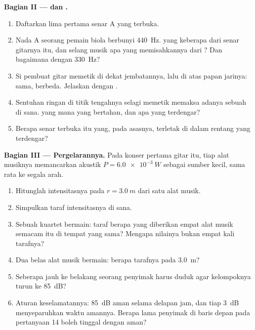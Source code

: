 \begin{problem}
\medskip
\noindent\textbf{Bagian II ---  dan .}
\begin{enumerate}[resume]
  \item Daftarkan lima  pertama senar A yang terbuka.
  \item Nada A seorang pemain biola berbunyi \qty{440}{Hz}. 
        yang keberapa dari senar gitarnya itu, dan selang musik apa yang
        memisahkannya dari ? Dan bagaimana dengan
        \qty{330}{Hz}?
  \item Si pembuat gitar memetik di dekat jembatannya, lalu di atas
        papan jarinya:  sama,  berbeda.
        Jelaskan dengan .
  \item Sentuhan ringan di titik tengahnya selagi memetik memaksa
        adanya sebuah  di sana.  yang mana yang bertahan,
        dan  apa yang terdengar?
  \item Berapa  senar terbuka itu yang, pada asasnya, terletak
        di dalam rentang yang terdengar?
\end{enumerate}

\medskip
\noindent\textbf{Bagian III --- Pergelarannya.}
Pada konser pertama gitar itu, tiap alat musiknya memancarkan 
akustik $P = \qty{6.0e-3}{W}$ sebagai sumber kecil, sama rata ke segala
arah.
\begin{enumerate}[resume]
  \item Hitunglah intensitasnya pada $r = \qty{3.0}{m}$ dari satu alat
        musik.
  \item Simpulkan taraf intensitasnya di sana.
  \item Sebuah kuartet bermain: taraf berapa yang diberikan empat alat
        musik semacam itu di tempat yang sama? Mengapa nilainya bukan
        empat kali tarafnya?
  \item Dua belas alat musik bermain: berapa tarafnya pada
        \qty{3.0}{m}?
  \item Seberapa jauh ke belakang seorang penyimak harus duduk agar
        kelompoknya turun ke \qty{85}{dB}?
  \item Aturan keselamatannya: \qty{85}{dB} aman selama delapan jam,
        dan tiap \qty{+3}{dB} menyeparuhkan waktu amannya. Berapa lama
        penyimak di baris depan pada pertanyaan 14 boleh tinggal dengan
        aman?
\end{enumerate}


\end{problem}

